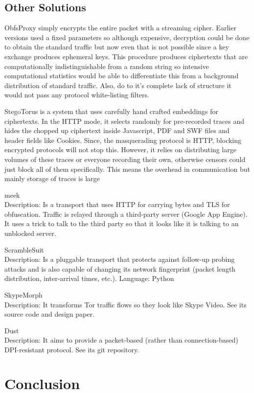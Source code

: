 \documentclass[10pt,a4paper]{article}
\begin{document}
\subsection{Other Solutions}

ObfsProxy simply encrypts the entire packet with a streaming cipher. Earlier versions used a fixed parameters so although expensive, decryption could be done to obtain the standard traffic but now even that is not possible since a key exchange produces ephemeral keys. This procedure produces ciphertexts that are computationally indistinguishable from a random string so intensive computational statistics would be able to differentiate this from a background distribution of standard traffic. Also, do to it's complete lack of structure it would not pass any protocol white-listing filters.

StegoTorus is a system that uses carefully hand crafted embeddings for ciphertexts. In the HTTP mode, it selects randomly for pre-recorded traces and hides the chopped up ciphertext inside Javascript, PDF and SWF files and header fields like Cookies. Since, the masquerading protocol is HTTP, blocking encrypted protocols will not stop this. However, it relies on distributing large volumes of these traces or everyone recording their own, otherwise censors could just block all of them specifically. This means the overhead in communication but mainly storage of traces is large 


meek\\
Description: Is a transport that uses HTTP for carrying bytes and TLS for obfuscation. Traffic is relayed through a third-party server (Google App Engine). It uses a trick to talk to the third party so that it looks like it is talking to an unblocked server.

ScrambleSuit\\
Description: Is a pluggable transport that protects against follow-up probing attacks and is also capable of changing its network fingerprint (packet length distribution, inter-arrival times, etc.).
Language: Python

SkypeMorph\\
Description: It transforms Tor traffic flows so they look like Skype Video. See its source code and design paper.

Dust\\
Description: It aims to provide a packet-based (rather than connection-based) DPI-resistant protocol. See its git repository.



\pagebreak
\section{Conclusion}

\pagebreak
\begingroup
\raggedright
{}

\endgroup
\end{document}
